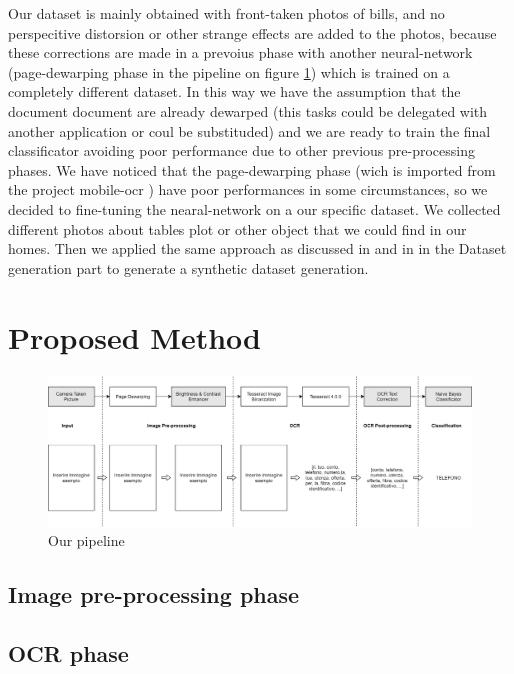 \documentclass[10pt,twocolumn,letterpaper]{article}
\begin{document}
Our dataset is mainly obtained with front-taken photos of bills, and no perspecitive distorsion or other strange effects are added to the photos, because these corrections are made in a prevoius phase with another neural-network (page-dewarping phase in the pipeline on figure \ref{pipeline}) which is trained on a completely different dataset. In this way we have the assumption that the document document are already dewarped (this tasks could be delegated with another application or coul be substituded) and we are ready to train the final classificator avoiding poor performance due to other previous pre-processing phases. We have noticed that the page-dewarping phase (wich is imported from the project mobile-ocr \cite{mobile-ocr}) have poor performances in some circumstances, so we decided to fine-tuning the nearal-network on a our specific dataset. We collected different photos about tables plot or other object that we could find in our homes. Then we applied the same approach as discussed in \cite{Improvingcamera-based} and in \cite{recoveringhomography} in the Dataset generation part to generate a synthetic dataset generation.


\section{Proposed Method}

\begin{figure}[h]
	\centering
	\includegraphics[width=1.0\textwidth]{images/pipeline.png}
	\caption{Our pipeline}
	\label{pipeline}
\end{figure}

\subsection{Image pre-processing phase}

\subsection{OCR phase}
\end{document}
